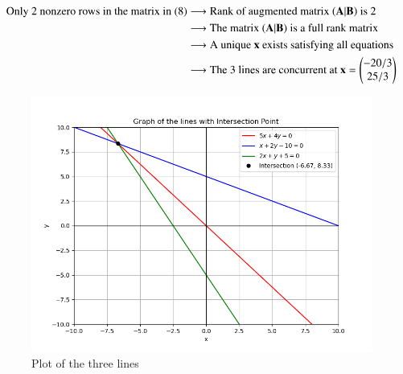 \documentclass[journal]{IEEEtran}
\begin{document}
\begin{align*}
    \text{Only $2$ nonzero rows in the matrix in (8)}
    &\longrightarrow \text{Rank of augmented matrix $\left(\mathbf{A}|\mathbf{B}\right)$ is $2$} \\
    &\longrightarrow \text{The matrix $\left(\mathbf{A}|\mathbf{B}\right)$ is a full rank matrix} \\
    &\longrightarrow \text{A unique $\mathbf{x}$ exists satisfying all equations} \\
    &\longrightarrow \text{The $3$ lines are concurrent at $\mathbf{x} = \begin{pmatrix}-20/3\\25/3\end{pmatrix}$}
\end{align*}
\begin{figure}[h!]
   \centering
   \includegraphics[width=\linewidth]{figs/01.png}
   \caption{Plot of the three lines}
   \label{Plot_1}
\end{figure}
\end{document}
